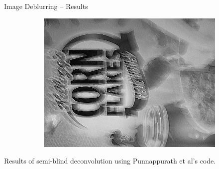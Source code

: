 \documentclass{beamer}
\begin{document}
\begin{frame}{Image Deblurring -- Results}
\begin{figure}
\begin{center}
\begin{subfigure}{Image deblurred using state of the art deconvolution algorithm.}
		\resizebox{20mm}{!} {\includegraphics {../images/deblur/jia_blind_deconv.png}}
	\end{subfigure}
\end{center}
\end{figure}

Results of semi-blind deconvolution using Punnappurath et al's code.


\end{frame}
\end{document}
